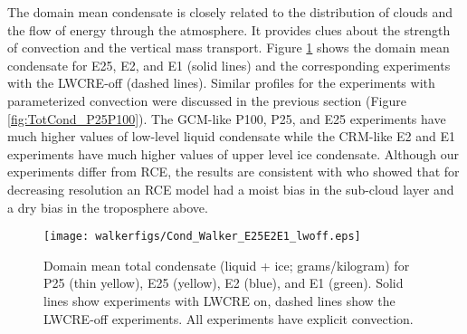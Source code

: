 \documentclass[draft]{agujournal2019}
\begin{document}
{%
The domain mean condensate is closely related to the distribution of clouds and the flow of energy through the atmosphere.  
It provides clues about the strength of convection and the vertical mass transport.     
Figure \ref{fig:TotCond} shows the domain mean condensate for E25, E2, and E1
(solid lines) and the corresponding experiments with the LWCRE-off (dashed lines).  Similar profiles for the experiments
with parameterized convection were discussed in the previous section (Figure \ref{fig:TotCond_P25P100}).  
The GCM-like P100, P25, and E25 experiments have much higher values of low-level liquid condensate while the CRM-like 
E2 and E1 experiments have much higher values of upper level ice condensate.  
Although our experiments differ from RCE, the results are consistent with  who showed that for 
decreasing resolution an RCE model had a moist bias in the sub-cloud layer and a dry bias in the troposphere above.  
 
\begin{figure}
  \centering
       \texttt{[image: walkerfigs/Cond\_Walker\_E25E2E1\_lwoff.eps]}
          \caption{Domain mean total condensate (liquid + ice; grams/kilogram) for P25 (thin yellow), E25 (yellow), 
          E2 (blue), and E1 (green).  Solid lines show experiments with LWCRE on,
          dashed lines show the LWCRE-off experiments.  All experiments have explicit convection.}
  \label{fig:TotCond}
\end{figure}
 
 

}
\end{document}
